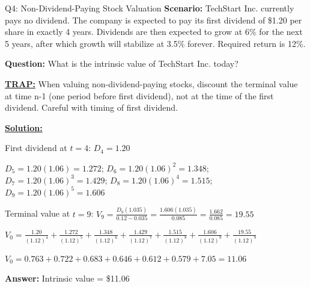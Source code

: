 \documentclass{beamer}
\renewcommand{\scriptsize}{\fontsize{6pt}{7pt}\selectfont}
\begin{document}
	\begin{frame}{Q4: Non-Dividend-Paying Stock Valuation}
		\scriptsize
		\textbf{Scenario:} TechStart Inc. currently pays no dividend. The company is expected to pay its first dividend of \$1.20 per share in exactly 4 years. Dividends are then expected to grow at 6\% for the next 5 years, after which growth will stabilize at 3.5\% forever. Required return is 12\%.
		
		\textbf{Question:} What is the intrinsic value of TechStart Inc. today?
		
		\vspace{2pt}
		\underline{\textbf{TRAP:}} When valuing non-dividend-paying stocks, discount the terminal value at time n-1 (one period before first dividend), not at the time of the first dividend. Careful with timing of first dividend.
		
		\vspace{4pt}
		\underline{\textbf{Solution:}}
		
		First dividend at $t=4$: $D_4 = 1.20$
		
		$D_5 = 1.20(1.06) = 1.272$; $D_6 = 1.20(1.06)^2 = 1.348$; $D_7 = 1.20(1.06)^3 = 1.429$; $D_8 = 1.20(1.06)^4 = 1.515$; $D_9 = 1.20(1.06)^5 = 1.606$
		
		\vspace{2pt}
		Terminal value at $t=9$:
		$V_9 = \frac{D_9(1.035)}{0.12-0.035} = \frac{1.606(1.035)}{0.085} = \frac{1.662}{0.085} = 19.55$
		
		\vspace{2pt}
		$V_0 = \frac{1.20}{(1.12)^4} + \frac{1.272}{(1.12)^5} + \frac{1.348}{(1.12)^6} + \frac{1.429}{(1.12)^7} + \frac{1.515}{(1.12)^8} + \frac{1.606}{(1.12)^9} + \frac{19.55}{(1.12)^9}$
		
		$V_0 = 0.763 + 0.722 + 0.683 + 0.646 + 0.612 + 0.579 + 7.05 = 11.06$
		
		\textbf{Answer:} Intrinsic value = \$11.06
	\end{frame}
	
\end{document}
